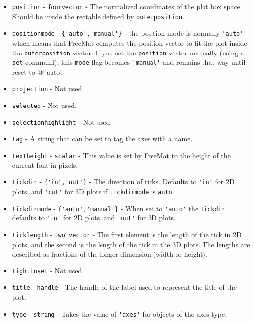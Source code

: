 \begin{itemize}
\item  \verb|position| - \verb|fourvector| - The normalized coordinates of the plot box space.
 Should be inside the rectable defined by \verb|outerposition|.

\item  \verb|positionmode| - \verb|{'auto','manual'}| - the position mode is normally \verb|'auto'|
 which means that FreeMat computes the position vector to fit the plot inside the \verb|outerposition|
 vector.  If you set the \verb|position| vector manually (using a \verb|set| command), this \verb|mode|
 flag becomes \verb|'manual'| and remains that way until reset to @|'auto'.

\item  \verb|projection| - Not used.

\item  \verb|selected| - Not used.

\item  \verb|selectionhighlight| - Not used.

\item  \verb|tag| - A string that can be set to tag the axes with a name.

\item  \verb|textheight| - \verb|scalar| - This value is set by FreeMat to the height of the
 current font in pixels.  

\item  \verb|tickdir| - \verb|{'in','out'}| - The direction of ticks.  Defaults to \verb|'in'| for 2D
 plots, and \verb|'out'| for 3D plots if \verb|tickdirmode| is \verb|auto|.

\item  \verb|tickdirmode| - \verb|{'auto','manual'}| - When set to \verb|'auto'| the \verb|tickdir| 
 defaults to \verb|'in'| for 2D plots, and \verb|'out'| for 3D plots.

\item  \verb|ticklength| - \verb|two vector| - The first element is the length of the tick in 
 2D plots, and the second is the length of the tick in the 3D plots.  The lengths are 
 described as fractions of the longer dimension (width or height).

\item  \verb|tightinset| - Not used.

\item  \verb|title| - \verb|handle| - The handle of the label used to represent the title of
 the plot.

\item  \verb|type| - \verb|string| - Takes the value of \verb|'axes'| for objects of the axes type.


\end{itemize}
